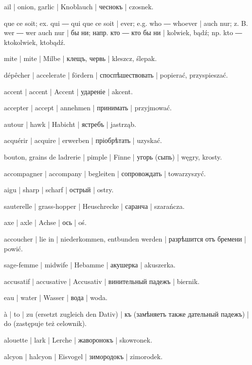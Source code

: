 \begin{outdent}{1em}
ail | onion, garlic | Knoblauch | чеснокъ | czosnek.

que ce soit; ex.  qui ―  qui que ce soit | ever; e.g.
 who ―  whoever | auch nur; z. B.  wer ―  wer auch nur | бы ни; напр.  кто ―  кто бы ни | kolwiek, bądź; np.  kto ―  ktokolwiek, ktobądź.

mite | mite | Milbe | клещъ, червь | kleszcz, ślepak.

dépêcher | accelerate | fördern | споспѣшествовать | popierać, przyspieszać.

accent | accent | Accent | удареніе | akcent.

accepter | accept | annehmen | принимать | przyjmować.

autour | hawk | Habicht | ястребъ | jastrząb.

acquérir | acquire | erwerben | пріобрѣтать | uzyskać.

bouton, grains de ladrerie | pimple | Finne | угорь (сыпь) | węgry, krosty.

accompagner | accompany | begleiten | сопровождать | towarzyszyć.

aigu | sharp | scharf | острый | ostry.

sauterelle | grass-hopper | Heuschrecke | саранча | szarańcza.

axe | axle | Achse | ось | oś.

accoucher | lie in | niederkommen, entbunden werden | разрѣшится отъ бремени | powić.

\uvsubentry{}
sage-femme | midwife | Hebamme | акушерка | akuszerka.

accusatif | accusative | Accusativ | винительный падежъ | biernik.

eau | water | Wasser | вода | woda.

à | to | zu (ersetzt zugleich den Dativ) | къ (замѣняетъ также
дательный падежъ) | do (zastępuje też celownik).

alouette | lark | Lerche | жаворонокъ | skowronek.

alcyon | halcyon | Eisvogel | зимородокъ | zimorodek.


\end{outdent}
